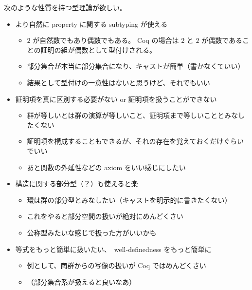 次のような性質を持つ型理論が欲しい。
\begin{itemize}
  \item より自然に property に関する subtyping が使える
  \begin{itemize}
    \item \(2\) が自然数でもあり偶数でもある。
    Coq の場合は \(2\) と \(2\) が偶数であることの証明の組が偶数として型付けされる。
    \item 部分集合が本当に部分集合になり、キャストが簡単（書かなくていい）
    \item 結果として型付けの一意性はないと思うけど、それでもいい
  \end{itemize}

  \item 証明項を真に区別する必要がない or 証明項を扱うことができない
  \begin{itemize}
    \item 群が等しいとは群の演算が等しいこと、証明項まで等しいこととみなしたくない
    \item 証明項を構成することもできるが、それの存在を覚えておくだけぐらいでいい
    \item あと関数の外延性などの axiom をいい感じにしたい
  \end{itemize}

  \item 構造に関する部分型（？）も使えると楽
  \begin{itemize}
    \item 環は群の部分型とみなしたい（キャストを明示的に書きたくない）
    \item これをやると部分空間の扱いが絶対にめんどくさい
    \item 公称型みたいな感じで扱った方がいいかも
  \end{itemize}

  \item 等式をもっと簡単に扱いたい、　well-definedness をもっと簡単に
  \begin{itemize}
    \item 例として、商群からの写像の扱いが Coq ではめんどくさい
    \item （部分集合系が扱えると良いなあ）
  \end{itemize}

\end{itemize}